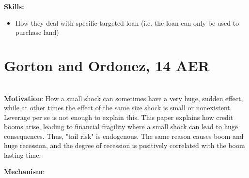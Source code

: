 \documentclass{book}
\theoremstyle{plain}
\theoremstyle{definition}
\begin{document}
\noindent
\textbf{Skills:}
\begin{itemize}
	\item How they deal with specific-targeted loan (i.e. the loan can only be used to purchase land)
\end{itemize}




\section{Gorton and Ordonez, 14 AER} %
\label{sec:gorton_and_ordonez_14}

\textbf{}\\


\textbf{Motivation}: How a small shock can sometimes have a very huge, sudden effect, while at other times the effect of the same size shock is small or nonexistent. Leverage per se is not enough to explain this. This paper explains how credit booms arise, leading to financial fragility where a small shock can lead to huge consequences. Thus, "tail risk" is endogenous. The same reason causes boom and huge recession, and the degree of recession is positively correlated with the boom lasting time.

\textbf{Mechanism}: 
\end{document}

